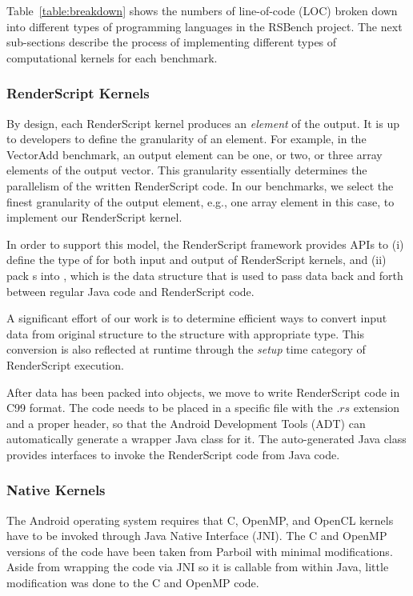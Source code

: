 Table~\ref{table:breakdown} shows the numbers of line-of-code (LOC) broken down
into different types of programming languages in the RSBench project. The next
sub-sections describe the process of implementing different types of computational
kernels for each benchmark.

\subsubsection{RenderScript Kernels}

By design, each RenderScript kernel produces an \textit{element} of the output.
It is up to developers to define the granularity of an element. For example, in
the VectorAdd benchmark, an output element can be one, or two, or three array
elements of the output vector. This granularity essentially determines the
parallelism of the written RenderScript code. In our benchmarks, we select the
finest granularity of the output element, e.g., one array element in this case,
to implement our RenderScript kernel.

In order to support this model, the RenderScript framework provides APIs to (i)
define the type of  for both input and output of RenderScript
kernels, and (ii) pack s into , which is the data
structure that is used to pass data back and forth between regular Java code and
RenderScript code.

A significant effort of our work is to determine efficient ways to convert input
data from original structure to the  structure with appropriate
 type. This conversion is also reflected at runtime through the
\textit{setup} time category of RenderScript execution.

After data has been packed into  objects, we move to write
RenderScript code in C99 format. The code needs to be placed in a specific file
with the $.rs$ extension and a proper header, so that the Android Development
Tools (ADT) can automatically generate a wrapper Java class for it. The
auto-generated Java class provides interfaces to invoke the RenderScript code
from Java code.

\subsubsection{Native Kernels}

The Android operating system requires that C, OpenMP, and OpenCL kernels have to
be invoked through Java Native Interface (JNI).  The C and OpenMP versions of
the code have been taken from Parboil with minimal modifications.  Aside from
wrapping the code via JNI so it is callable from within Java, little
modification was done to the C and OpenMP code.

